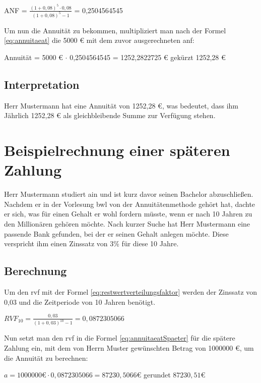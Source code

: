 \bigskip

ANF = $\frac{ (1 + 0,08)^5 \cdot 0,08 }{ (1 + 0,08)^5 - 1 }$ = 0,2504564545

\bigskip

\noindent
Um nun die Annuität zu bekommen, multipliziert man nach der Formel \eqref{eq:annuitaeat} die 5000 € mit dem zuvor ausgerechneten \ac{anf}:

\bigskip

Annuität = 5000 € $\cdot$ 0,2504564545 = 1252,2822725 € gekürzt 1252,28 €

\subsection{Interpretation}

Herr Mustermann hat eine Annuität von 1252,28 €, was bedeutet, dass ihm Jährlich 1252,28 € als gleichbleibende Summe zur Verfügung stehen.


\section{Beispielrechnung einer späteren Zahlung}

Herr Mustermann studiert \ac{ain} und ist kurz davor seinen Bachelor abzuschließen. Nachdem er in der Vorlesung \ac{bwl} von der Annuitätenmethode gehört hat, dachte er sich, was für einen Gehalt er wohl fordern müsste, wenn er nach 10 Jahren zu den Millionären gehören möchte. Nach kurzer Suche hat Herr Mustermann eine passende Bank gefunden, bei der er seinen Gehalt anlegen möchte. Diese verspricht ihm einen Zinssatz von 3\% für diese 10 Jahre.

\subsection{Berechnung}

Um den \ac{rvf} mit der Formel \eqref{eq:restwertverteilungsfaktor} werden der Zinssatz von 0,03 und die Zeitperiode von 10 Jahren benötigt.

\bigskip
$RVF_{10} = \frac{ 0,03 }{ (1 + 0,03)^{10} - 1 } = 0,0872305066$

\bigskip
\noindent
Nun setzt man den \ac{rvf} in die Formel \eqref{eq:annuitaeatSpaeter} für die spätere Zahlung ein, mit dem von Herrn Muster gewünschten Betrag von 1000000 €, um die Annuität zu berechnen:

\bigskip
$a = 1000000 \text{€} \cdot 0,0872305066 = 87230,5066 \text{€}$ gerundet $87230,51 \text{€}$

